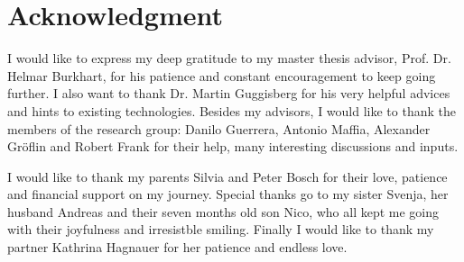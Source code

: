 \chapter*{Acknowledgment}
I would like to express my deep gratitude to my master thesis advisor, Prof. Dr. Helmar Burkhart, for his patience and constant encouragement to keep going further.
I also want to thank Dr. Martin Guggisberg for his very helpful advices and hints to existing technologies.
Besides my advisors, I would like to thank the members of the research group: Danilo Guerrera,
Antonio Maffia, Alexander Gr\"oflin and Robert Frank for their help, many interesting discussions and inputs.

I would like to thank my parents Silvia and Peter Bosch for their love, patience and financial support on my journey.
Special thanks go to my sister Svenja, her husband Andreas and their seven months old son Nico, who all kept me going with their joyfulness and irresistble smiling.
Finally I would like to thank my partner Kathrina Hagnauer for her patience and endless love.
